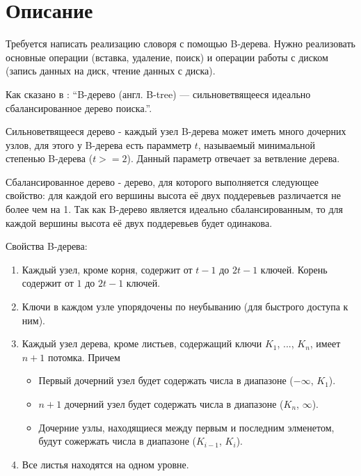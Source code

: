 \section{Описание}
Требуется написать реализацию словоря с помощью B-дерева. Нужно реализовать основные операции (вставка, удаление, поиск) и 
операции работы с диском (запись данных на диск, чтение данных с диска).


Как сказано в \cite{wiki_abstract}: \enquote{B-дерево (англ. B-tree) — сильноветвящееся идеально сбалансированное дерево поиска.}.


Сильноветвящееся дерево - каждый узел B-дерева может иметь много дочерних узлов, для этого у B-дерева есть парамметр $t$, 
называемый минимальной степенью B-дерева ($t >= 2$). Данный параметр отвечает за ветвление дерева.


Сбалансированное дерево - дерево, для которого выполняется следующее свойство: для каждой его вершины высота её двух поддеревьев различается не более чем на 1.
Так как B-дерево является идеально сбалансированным, то для каждой вершины высота её двух поддеревьев будет одинакова.

\vspace{2\baselineskip}
Свойства B-дерева:

\begin{enumerate}
    \item Каждый узел, кроме корня, содержит от $t-1$ до $2t-1$ ключей. Корень содержит от $1$ до $2t-1$ ключей. 
    \item Ключи в каждом узле упорядочены по неубыванию (для быстрого доступа к ним).
    \item Каждый узел дерева, кроме листьев, содержащий ключи $K_1$, ..., $K_n$, имеет $n+1$ потомка. Причем
    
    \begin{itemize}
        \item Первый дочерний узел будет содержать числа в диапазоне ($-\infty$, $K_1$).
        \item $n+1$ дочерний узел будет содержать числа в диапазоне ($K_n$, $\infty$).
        \item Дочерние узлы, находящиеся между первым и последним элменетом, будут сожержать числа в диапазоне ($K_{i-1}$, $K_i$).
    \end{itemize}

    \item Все листья находятся на одном уровне.
\end{enumerate}


